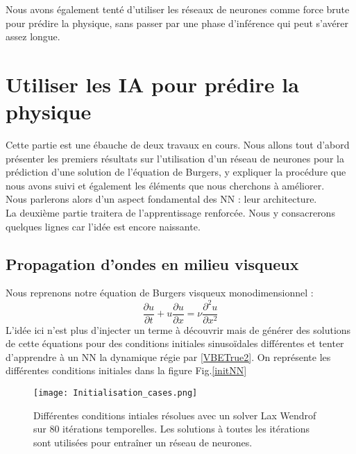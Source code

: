 \documentclass[a4paper,12pt]{article}
\newcommand\bk{\color{black}}
\newcommand\brick{\color{brick}}
\newcommand\navy{\color{navy}}
\numberwithin{equation}{section} %
\begin{document}
\noindent Nous avons également tenté d'utiliser les réseaux de neurones comme force brute pour prédire la physique, sans passer par une phase d'inférence qui peut s'avérer assez longue.
\navy \section{Utiliser les IA pour prédire la physique} \bk \label{NNdirect}
\noindent Cette partie est une ébauche de deux travaux en cours. Nous allons tout d'abord présenter les premiers résultats sur l'utilisation d'un réseau de neurones pour la prédiction d'une solution de l'équation de Burgers, y expliquer la procédure que nous avons suivi et également les éléments que nous cherchons à améliorer. \\
Nous parlerons alors d'un aspect fondamental des NN : leur architecture.\\
La deuxième partie traitera de l'apprentissage renforcée. Nous y consacrerons quelques lignes car l'idée est encore naissante.
\brick \subsection{Propagation d'ondes en milieu visqueux}\bk
\noindent Nous reprenons notre équation de Burgers visqueux monodimensionnel : 
\begin{equation}
\frac{\partial u}{\partial t} + u \frac{\partial u}{\partial x} = \nu\frac{\partial^2 u}{\partial x^2}  \label{VBETrue2} \tag{VBE}
\end{equation}
L'idée ici n'est plus d'injecter un terme à découvrir mais de générer des solutions de cette équations pour des conditions initiales sinusoïdales différentes et tenter d'apprendre à un NN la dynamique régie par \eqref{VBETrue2}. On représente les différentes conditions initiales dans la figure Fig.\eqref{initNN}

\begin{figure}[!ht]
\centering
\vspace{-5mm}
\texttt{[image: Initialisation\_cases.png]}
\caption{\small{Différentes conditions intiales résolues avec un solver Lax Wendrof sur 80 itérations temporelles. Les solutions à toutes les itérations sont utilisées pour entraîner un réseau de neurones.}}
\label{initNN}
\end{figure}
\end{document}
